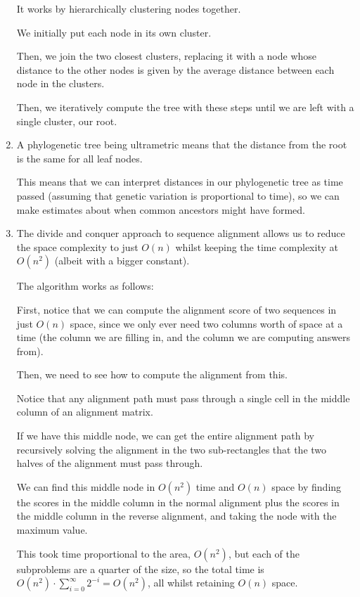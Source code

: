 \begin{enumerate}[label=(\alph*)]
    It works by hierarchically clustering nodes together.

    We initially put each node in its own cluster.

    Then, we join the two closest clusters, replacing it with a node whose distance to the other nodes is given by the average distance between each node in the clusters.

    Then, we iteratively compute the tree with these steps until we are left with a single cluster, our root.

  \item

    A phylogenetic tree being ultrametric means that the distance from the root is the same for all leaf nodes.

    This means that we can interpret distances in our phylogenetic tree as time passed (assuming that genetic variation is proportional to time), so we can make estimates about when common ancestors might have formed.

  \item
    The divide and conquer approach to sequence alignment allows us to reduce the space complexity to just $O(n)$ whilst keeping the time complexity at $O(n^2)$ (albeit with a bigger constant).

    The algorithm works as follows:

    First, notice that we can compute the alignment score of two sequences in just $O(n)$ space, since we only ever need two columns worth of space at a time (the column we are filling in, and the column we are computing answers from).

    Then, we need to see how to compute the alignment from this.

    Notice that any alignment path must pass through a single cell in the middle column of an alignment matrix.

    If we have this middle node, we can get the entire alignment path by recursively solving the alignment in the two sub-rectangles that the two halves of the alignment must pass through.

    We can find this middle node in $O(n^2)$ time and $O(n)$ space by finding the scores in the middle column in the normal alignment plus the scores in the middle column in the reverse alignment, and taking the node with the maximum value.

    This took time proportional to the area, $O(n^2)$, but each of the subproblems are a quarter of the size, so the total time is $O(n^2) \cdot \sum_{i=0}^\infty 2^{-i} = O(n^2)$, all whilst retaining $O(n)$ space.


    
        
\end{enumerate}

